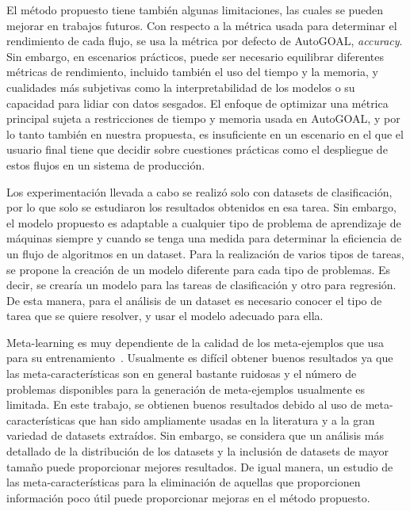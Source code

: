 El método propuesto tiene también algunas limitaciones, las cuales se pueden mejorar en trabajos futuros. Con respecto a la métrica usada para determinar el rendimiento de cada flujo, se usa la métrica por defecto de AutoGOAL, \textit{accuracy}. Sin embargo, en escenarios prácticos, puede ser necesario equilibrar diferentes métricas de rendimiento, incluido también el uso del tiempo y la memoria, y cualidades más subjetivas como la interpretabilidad de los modelos o su capacidad para lidiar con datos sesgados. El enfoque de optimizar una métrica principal sujeta a restricciones de tiempo y memoria usada en AutoGOAL, y por lo tanto también en nuestra propuesta, es insuficiente en un escenario en el que el usuario final tiene que decidir sobre cuestiones prácticas como el despliegue de estos flujos en un sistema de producción. %

Los experimentación llevada a cabo se realizó solo con datasets de clasificación, por lo que solo se estudiaron los resultados obtenidos en esa tarea. Sin embargo, el modelo propuesto es adaptable a cualquier tipo de problema de aprendizaje de máquinas siempre y cuando se tenga una medida para determinar la eficiencia de un flujo de algoritmos en un dataset. Para la realización de varios tipos de tareas, se propone la creación de un modelo diferente para cada tipo de problemas. Es decir, se crearía un modelo para las tareas de clasificación y otro para regresión. De esta manera, para el análisis de un dataset es necesario conocer el tipo de tarea que se quiere resolver, y usar el modelo adecuado para ella.

Meta-learning es muy dependiente de la calidad de los meta-ejemplos que usa para su entrenamiento~\cite{gomes2012combining}. Usualmente es difícil obtener buenos resultados ya que las meta-características son en general bastante ruidosas y el número de problemas disponibles para la generación de meta-ejemplos usualmente es limitada. En este trabajo, se obtienen buenos resultados debido al uso de meta-características que han sido ampliamente usadas en la literatura y a la gran variedad de datasets extraídos. Sin embargo, se considera que un análisis más detallado de la distribución de los datasets y la inclusión de datasets de mayor tamaño puede proporcionar mejores resultados. De igual manera, un estudio de las meta-características para la eliminación de aquellas que proporcionen información poco útil puede proporcionar mejoras en el método propuesto.

